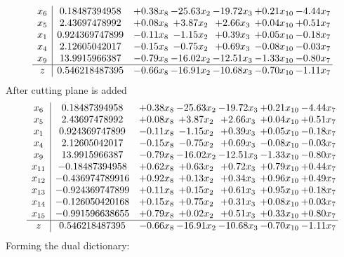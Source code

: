 \documentclass[8pt]{article}
\begin{document}
\[\begin{array}{c| c c@{\hskip 2pt} c@{\hskip 2pt} c@{\hskip 2pt} c@{\hskip 2pt} c@{\hskip 2pt} }
 x_{6}   &  0.18487394958 & +  0.38 x_{8} & -25.63 x_{2} & -19.72 x_{3} & +  0.21 x_{10} & -4.44 x_{7}\\
 x_{5}   &  2.43697478992 & +  0.08 x_{8} & +  3.87 x_{2} & +  2.66 x_{3} & +  0.04 x_{10} & +  0.51 x_{7}\\
 x_{1}   &  0.924369747899 & -0.11 x_{8} & -1.15 x_{2} & +  0.39 x_{3} & +  0.05 x_{10} & -0.18 x_{7}\\
 x_{4}   &  2.12605042017 & -0.15 x_{8} & -0.75 x_{2} & +  0.69 x_{3} & -0.08 x_{10} & -0.03 x_{7}\\
 x_{9}   &  13.9915966387 & -0.79 x_{8} & -16.02 x_{2} & -12.51 x_{3} & -1.33 x_{10} & -0.80 x_{7}\\
\hline
z    &  0.546218487395 & -0.66 x_{8} & -16.91 x_{2} & -10.68 x_{3} & -0.70 x_{10} & -1.11 x_{7}\\
\end{array}\]
 After cutting plane is added 
\[\begin{array}{c| c c@{\hskip 2pt} c@{\hskip 2pt} c@{\hskip 2pt} c@{\hskip 2pt} c@{\hskip 2pt} }
 x_{6}   &  0.18487394958 & +  0.38 x_{8} & -25.63 x_{2} & -19.72 x_{3} & +  0.21 x_{10} & -4.44 x_{7}\\
 x_{5}   &  2.43697478992 & +  0.08 x_{8} & +  3.87 x_{2} & +  2.66 x_{3} & +  0.04 x_{10} & +  0.51 x_{7}\\
 x_{1}   &  0.924369747899 & -0.11 x_{8} & -1.15 x_{2} & +  0.39 x_{3} & +  0.05 x_{10} & -0.18 x_{7}\\
 x_{4}   &  2.12605042017 & -0.15 x_{8} & -0.75 x_{2} & +  0.69 x_{3} & -0.08 x_{10} & -0.03 x_{7}\\
 x_{9}   &  13.9915966387 & -0.79 x_{8} & -16.02 x_{2} & -12.51 x_{3} & -1.33 x_{10} & -0.80 x_{7}\\
 x_{11}   &  -0.18487394958 & +  0.62 x_{8} & +  0.63 x_{2} & +  0.72 x_{3} & +  0.79 x_{10} & +  0.44 x_{7}\\
 x_{12}   &  -0.436974789916 & +  0.92 x_{8} & +  0.13 x_{2} & +  0.34 x_{3} & +  0.96 x_{10} & +  0.49 x_{7}\\
 x_{13}   &  -0.924369747899 & +  0.11 x_{8} & +  0.15 x_{2} & +  0.61 x_{3} & +  0.95 x_{10} & +  0.18 x_{7}\\
 x_{14}   &  -0.126050420168 & +  0.15 x_{8} & +  0.75 x_{2} & +  0.31 x_{3} & +  0.08 x_{10} & +  0.03 x_{7}\\
 x_{15}   &  -0.991596638655 & +  0.79 x_{8} & +  0.02 x_{2} & +  0.51 x_{3} & +  0.33 x_{10} & +  0.80 x_{7}\\
\hline
z    &  0.546218487395 & -0.66 x_{8} & -16.91 x_{2} & -10.68 x_{3} & -0.70 x_{10} & -1.11 x_{7}\\
\end{array}\]
Forming the dual dictionary:
\end{document}
